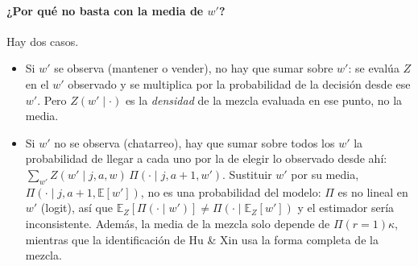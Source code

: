 \documentclass{article}
\begin{document}
\paragraph{¿Por qué no basta con la media de $w'$?} Hay dos casos.
\begin{itemize}
    \item Si $w'$ se observa (mantener o vender), no hay que sumar sobre $w'$: se evalúa $Z$ en el $w'$ observado y se multiplica por la probabilidad de la decisión desde ese $w'$. Pero $Z(w'\mid\cdot)$ es la \emph{densidad} de la mezcla evaluada en ese punto, no la media.
    \item Si $w'$ no se observa (chatarreo), hay que sumar sobre todos los $w'$ la probabilidad de llegar a cada uno por la de elegir lo observado desde ahí: $\sum_{w'}Z(w'\mid j,a,w)\,\Pi(\cdot\mid j,a+1,w')$. Sustituir $w'$ por su media, $\Pi(\cdot\mid j,a+1,\mathbb{E}[w'])$, no es una probabilidad del modelo: $\Pi$ es no lineal en $w'$ (logit), así que $\mathbb{E}_Z[\Pi(\cdot\mid w')]\neq\Pi(\cdot\mid\mathbb{E}_Z[w'])$ y el estimador sería inconsistente. Además, la media de la mezcla solo depende de $\Pi(r=1)\kappa$, mientras que la identificación de Hu \& Xin usa la forma completa de la mezcla.
\end{itemize}
\end{document}
